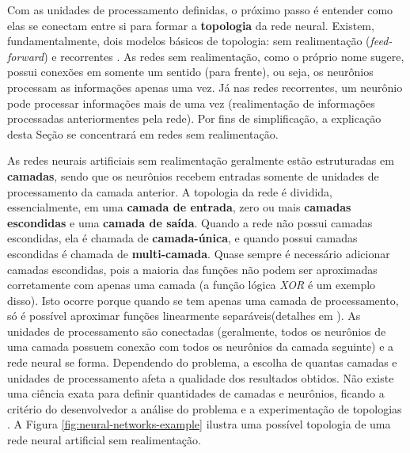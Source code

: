 Com as unidades de processamento definidas, o próximo passo é entender como elas
se conectam entre si para formar a \textbf{topologia} da rede neural. Existem,
fundamentalmente, dois modelos básicos de topologia: sem realimentação
(\textit{feed-forward}) e recorrentes \cite[Cap. 18]{RussellNorvig200912}. As
redes sem realimentação, como o próprio nome sugere, possui conexões em somente
um sentido (para frente), ou seja, os neurônios processam as informações apenas
uma vez. Já nas redes recorrentes, um neurônio pode processar informações mais
de uma vez (realimentação de informações processadas anteriormentes pela rede).
Por fins de simplificação, a explicação desta Seção se concentrará em redes sem
realimentação.

As redes neurais artificiais sem realimentação geralmente estão estruturadas em
\textbf{camadas}, sendo que os neurônios recebem entradas somente de unidades de
processamento da camada anterior. A topologia da rede é dividida,
essencialmente, em uma \textbf{camada de entrada}, zero ou mais \textbf{camadas
escondidas} e uma \textbf{camada de saída}. Quando a rede não possui camadas
escondidas, ela é chamada de \textbf{camada-única}, e quando possui camadas
escondidas é chamada de \textbf{multi-camada}. Quase sempre é necessário
adicionar camadas escondidas, pois a maioria das funções não podem ser
aproximadas corretamente com apenas uma camada (a função lógica \textit{XOR} é
um exemplo disso). Isto ocorre porque quando se tem apenas uma camada de
processamento, só é possível aproximar funções linearmente separáveis(detalhes
em \cite[Cap. 18]{RussellNorvig200912}). As unidades de processamento são
conectadas (geralmente, todos os neurônios de uma camada possuem conexão com
todos os neurônios da camada seguinte) e a rede neural se forma. Dependendo do
problema, a escolha de quantas camadas e unidades de processamento afeta a
qualidade dos resultados obtidos. Não existe uma ciência exata para definir
quantidades de camadas e neurônios, ficando a critério do desenvolvedor a
análise do problema e a experimentação de topologias \cite[Cap.
18]{RussellNorvig200912}. A Figura \ref{fig:neural-networks-example} ilustra uma
possível topologia de uma rede neural artificial sem realimentação.

